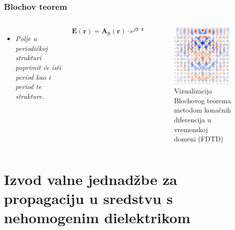 \documentclass{beamer}
\begin{document}
\begin{frame}
	\frametitle{Blochov teorem}
	\begin{columns}
        \begin{itemize}
            \item[] \emph{Polje u periodičkoj strukturi poprimit će isti period
                kao i period te strukture.}
        \end{itemize}

        \begin{equation} \label{eq:bloch}
            \mathbf{E}(\mathbf{r}) =
            \mathbf{A}_{\bm{\beta}}(\mathbf{r}) \cdot
                e^{j {\bm{\beta}} \cdot \mathbf{r}}
        \end{equation}

		\begin{figure}[ht]
			\centering
			\includegraphics[width = \linewidth]
				{./images/bloch_theorem.png}
            \caption{Vizualizacija Blochovog teorema metodom konačnih
                diferencija u vremenskoj domeni (FDTD)}
			\label{fig:structure}
		\end{figure}
	\end{columns}
\end{frame}

\section{Izvod valne jednadžbe za propagaciju u sredstvu s nehomogenim
dielektrikom}
\end{document}
